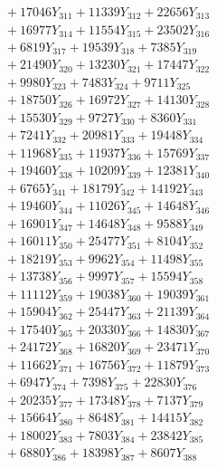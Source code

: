\documentclass[a4paper,10pt]{article}
\begin{document}
{\begin{align}
&\;  + 17046 Y_{311} + 11339 Y_{312} + 22656 Y_{313} \\[0.3ex]
&\;  + 16977 Y_{314} + 11554 Y_{315} + 23502 Y_{316} \\[0.3ex]
&\;  + 6819 Y_{317} + 19539 Y_{318} + 7385 Y_{319} \\[0.3ex]
&\;  + 21490 Y_{320} + 13230 Y_{321} + 17447 Y_{322} \\[0.3ex]
&\;  + 9980 Y_{323} + 7483 Y_{324} + 9711 Y_{325} \\[0.3ex]
&\;  + 18750 Y_{326} + 16972 Y_{327} + 14130 Y_{328} \\[0.5ex]\allowbreak
&\;  + 15530 Y_{329} + 9727 Y_{330} + 8360 Y_{331} \\[0.3ex]
&\;  + 7241 Y_{332} + 20981 Y_{333} + 19448 Y_{334} \\[0.3ex]
&\;  + 11968 Y_{335} + 11937 Y_{336} + 15769 Y_{337} \\[0.3ex]
&\;  + 19460 Y_{338} + 10209 Y_{339} + 12381 Y_{340} \\[0.3ex]
&\;  + 6765 Y_{341} + 18179 Y_{342} + 14192 Y_{343} \\[0.3ex]
&\;  + 19460 Y_{344} + 11026 Y_{345} + 14648 Y_{346} \\[0.3ex]
&\;  + 16901 Y_{347} + 14648 Y_{348} + 9588 Y_{349} \\[0.3ex]
&\;  + 16011 Y_{350} + 25477 Y_{351} + 8104 Y_{352} \\[0.3ex]
&\;  + 18219 Y_{353} + 9962 Y_{354} + 11498 Y_{355} \\[0.3ex]
&\;  + 13738 Y_{356} + 9997 Y_{357} + 15594 Y_{358} \\[0.5ex]\allowbreak
&\;  + 11112 Y_{359} + 19038 Y_{360} + 19039 Y_{361} \\[0.3ex]
&\;  + 15904 Y_{362} + 25447 Y_{363} + 21139 Y_{364} \\[0.3ex]
&\;  + 17540 Y_{365} + 20330 Y_{366} + 14830 Y_{367} \\[0.3ex]
&\;  + 24172 Y_{368} + 16820 Y_{369} + 23471 Y_{370} \\[0.3ex]
&\;  + 11662 Y_{371} + 16756 Y_{372} + 11879 Y_{373} \\[0.3ex]
&\;  + 6947 Y_{374} + 7398 Y_{375} + 22830 Y_{376} \\[0.3ex]
&\;  + 20235 Y_{377} + 17348 Y_{378} + 7137 Y_{379} \\[0.3ex]
&\;  + 15664 Y_{380} + 8648 Y_{381} + 14415 Y_{382} \\[0.3ex]
&\;  + 18002 Y_{383} + 7803 Y_{384} + 23842 Y_{385} \\[0.3ex]
&\;  + 6880 Y_{386} + 18398 Y_{387} + 8607 Y_{388} \\[0.5ex]\allowbreak

\end{align}}
\end{document}
